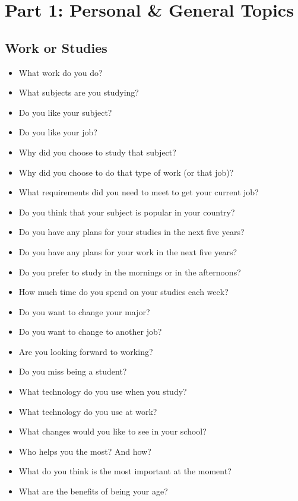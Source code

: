 \chapter{Part 1: Personal \& General Topics}

\section{Work or Studies}
\begin{ieltsprompt}
\begin{itemize}[itemsep=4pt]
    \item What work do you do?
    \item What subjects are you studying?
    \item Do you like your subject?
    \item Do you like your job?
    \item Why did you choose to study that subject?
    \item Why did you choose to do that type of work (or that job)?
    \item What requirements did you need to meet to get your current job?
    \item Do you think that your subject is popular in your country?
    \item Do you have any plans for your studies in the next five years?
    \item Do you have any plans for your work in the next five years?
    \item Do you prefer to study in the mornings or in the afternoons?
    \item How much time do you spend on your studies each week?
    \item Do you want to change your major?
    \item Do you want to change to another job?
    \item Are you looking forward to working?
    \item Do you miss being a student?
    \item What technology do you use when you study?
    \item What technology do you use at work?
    \item What changes would you like to see in your school?
    \item Who helps you the most? And how?
    \item What do you think is the most important at the moment?
    \item What are the benefits of being your age?
\end{itemize}
\end{ieltsprompt}


